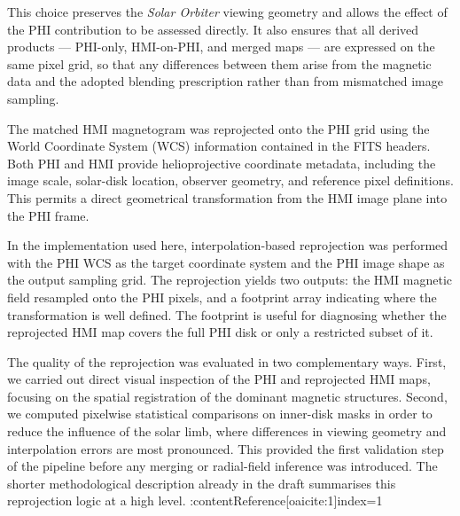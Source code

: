 \documentclass[namedreferences,hyperref,optionalrh]{spr-sola}
\begin{document}
This choice preserves the \textit{Solar Orbiter} viewing geometry and allows the effect of the PHI contribution to be assessed directly. It also ensures that all derived products --- PHI-only, HMI-on-PHI, and merged maps --- are expressed on the same pixel grid, so that any differences between them arise from the magnetic data and the adopted blending prescription rather than from mismatched image sampling.


The matched HMI magnetogram was reprojected onto the PHI grid using the World Coordinate System (WCS) information contained in the FITS headers. Both PHI and HMI provide helioprojective coordinate metadata, including the image scale, solar-disk location, observer geometry, and reference pixel definitions. This permits a direct geometrical transformation from the HMI image plane into the PHI frame.

In the implementation used here, interpolation-based reprojection was performed with the PHI WCS as the target coordinate system and the PHI image shape as the output sampling grid. The reprojection yields two outputs: the HMI magnetic field resampled onto the PHI pixels, and a footprint array indicating where the transformation is well defined. The footprint is useful for diagnosing whether the reprojected HMI map covers the full PHI disk or only a restricted subset of it.

The quality of the reprojection was evaluated in two complementary ways. First, we carried out direct visual inspection of the PHI and reprojected HMI maps, focusing on the spatial registration of the dominant magnetic structures. Second, we computed pixelwise statistical comparisons on inner-disk masks in order to reduce the influence of the solar limb, where differences in viewing geometry and interpolation errors are most pronounced. This provided the first validation step of the pipeline before any merging or radial-field inference was introduced. The shorter methodological description already in the draft summarises this reprojection logic at a high level. :contentReference[oaicite:1]{index=1}

\end{document}
